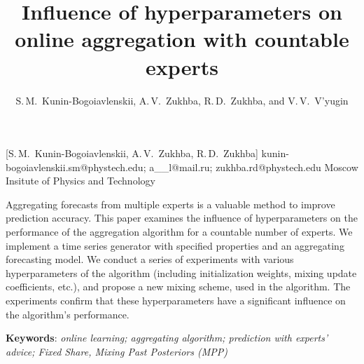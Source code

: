 \documentclass[12pt, twoside]{article}
\begin{document}
\English

\title
    [] %
    {Influence of hyperparameters on online aggregation with countable experts} %
\author
    [S.\,M.~Kunin-Bogoiavlenskii] %
    {S.\,M.~Kunin-Bogoiavlenskii, A.\,V.~Zukhba, R.\,D.~Zukhba, and V.\,V.~V’yugin} %
    [S.\,M.~Kunin-Bogoiavlenskii, A.\,V.~Zukhba, R.\,D.~Zukhba] %
\email
    {kunin-bogoiavlenskii.sm@phystech.edu; a\_\_l@mail.ru; zukhba.rd@phystech.edu}
\organization
    {Moscow Insitute of Physics and Technology}
\abstract
    {

    Aggregating forecasts from multiple experts is a valuable method to improve prediction accuracy.
    This paper examines the influence of hyperparameters on the performance of the aggregation algorithm for a countable number of experts.
    We implement a time series generator with specified properties and an aggregating forecasting model. 
    We conduct a series of experiments with various hyperparameters of the algorithm (including initialization weights, mixing update coefficients, etc.), and propose a new mixing scheme, used in the algorithm.
    The experiments confirm that these hyperparameters have a significant influence on the algorithm's performance.           
        
%   
%   
%   
%               
    \noindent
        \textbf{Keywords}: \emph{online learning; aggregating algorithm; prediction with experts’ advice; Fixed Share, Mixing Past Posteriors (MPP)}}
\end{document}
